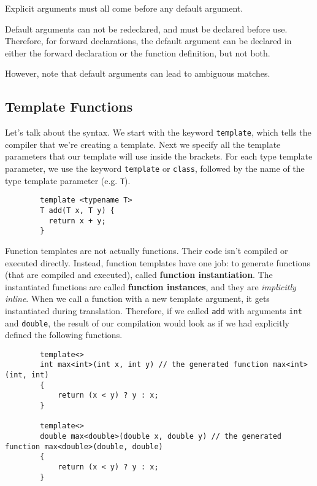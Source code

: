 \documentclass{article}
\begin{document}
    Explicit arguments must all come before any default argument. 

    Default arguments can not be redeclared, and must be declared before use. Therefore, for forward declarations, the default argument can be declared in either the forward declaration or the function definition, but not both.   

    However, note that default arguments can lead to ambiguous matches. 

  \subsection{Template Functions}

    \begin{definition}
      Let's talk about the syntax. We start with the keyword \texttt{template}, which tells the compiler that we're creating a template. Next we specify all the template parameters that our template will use inside the brackets. For each type template parameter, we use the keyword \texttt{template} or \texttt{class}, followed by the name of the type template parameter (e.g. \texttt{T}). 
      \begin{lstlisting}
        template <typename T> 
        T add(T x, T y) {
          return x + y; 
        } 
      \end{lstlisting}
      Function templates are not actually functions. Their code isn't compiled or executed directly. Instead, function templates have one job: to generate functions (that are compiled and executed), called \textbf{function instantiation}. The instantiated functions are called \textbf{function instances}, and they are \textit{implicitly inline}. When we call a function with a new template argument, it gets instantiated during translation. Therefore, if we called \texttt{add} with arguments \texttt{int} and \texttt{double}, the result of our compilation would look as if we had explicitly defined the following functions. 
      \begin{lstlisting}
        template<>
        int max<int>(int x, int y) // the generated function max<int>(int, int)
        {
            return (x < y) ? y : x;
        }

        template<>
        double max<double>(double x, double y) // the generated function max<double>(double, double)
        {
            return (x < y) ? y : x;
        }
      \end{lstlisting}
    \end{definition}
\end{document}
